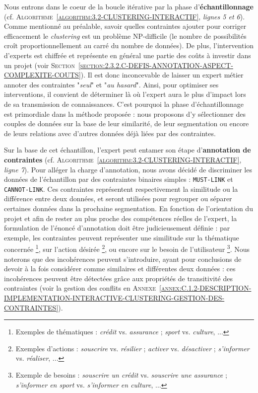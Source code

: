 		Nous entrons dans le coeur de la boucle itérative par la phase d'\textbf{échantillonnage} (cf. \textsc{Algorithme~\ref{algorithm:3.2-CLUSTERING-INTERACTIF}}, \textit{lignes 5 et 6}).
		Comme mentionné au préalable, savoir quelles contraintes ajouter pour corriger efficacement le \textit{clustering} est un problème NP-difficile (le nombre de possibilités croît proportionnellement au carré du nombre de données).
		De plus, l'intervention d'experts est chiffrée et représente en général une partie des coûts à investir dans un projet (voir \textsc{Section~\ref{section:2.3.2.C-DEFIS-ANNOTATION-ASPECT-COMPLEXITE-COUTS}}).
		Il est donc inconcevable de laisser un expert métier annoter des contraintes "\textit{seul}" et "\textit{au hasard}".
		Ainsi, pour optimiser ses interventions, il convient de déterminer là où l'expert aura le plus d'impact lors de sa transmission de connaissances.
		C'est pourquoi la phase d'échantillonnage est primordiale dans la méthode proposée : nous proposons d'y sélectionner des couples de données sur la base de leur similarité, de leur segmentation ou encore de leurs relations avec d'autres données déjà liées par des contraintes.
		
		Sur la base de cet échantillon, l'expert peut entamer son étape d'\textbf{annotation de contraintes} (cf. \textsc{Algorithme~\ref{algorithm:3.2-CLUSTERING-INTERACTIF}}, \textit{ligne 7}).
		Pour alléger la charge d'annotation, nous avons décidé de discriminer les données de l'échantillon par des contraintes binaires simples : \texttt{MUST-LINK} et \texttt{CANNOT-LINK}.
		Ces contraintes représentent respectivement la similitude ou la différence entre deux données, et seront utilisées pour regrouper ou séparer certaines données dans la prochaine segmentation.
		En fonction de l'orientation du projet et afin de rester au plus proche des compétences réelles de l'expert, la formulation de l'énoncé d'annotation doit être judicieusement définie : par exemple, les contraintes peuvent représenter une similitude
		sur la thématique concernée \footnote{
			Exemples de thématiques : \textit{crédit} vs. \textit{assurance} ; \textit{sport} vs. \textit{culture}, ...
		}, sur l'action désirée \footnote{
			Exemples d'actions : \textit{souscrire} vs. \textit{résilier} ; \textit{activer} vs. \textit{désactiver} ; \textit{s'informer} vs. \textit{réaliser}, ...
		}, ou encore sur le besoin de l'utilisateur \footnote{
			Exemple de besoins : \textit{souscrire un crédit} vs. \textit{souscrire une assurance} ; \textit{s'informer en sport} vs. \textit{s'informer en culture}, ...
		}.
		Nous noterons que des incohérences peuvent s'introduire, ayant pour conclusions de devoir à la fois considérer comme similaires et différentes deux données : ces incohérences peuvent être détectées grâce aux propriétés de transitivité des contraintes (voir la gestion des conflits en \textsc{Annexe~\ref{annex:C.1.2-DESCRIPTION-IMPLEMENTATION-INTERACTIVE-CLUSTERING-GESTION-DES-CONTRAINTES}}).
		
